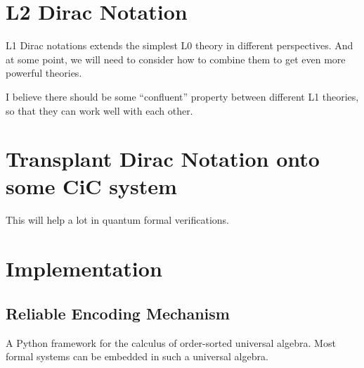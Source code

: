 \section{L2 Dirac Notation}

L1 Dirac notations extends the simplest L0 theory in different perspectives.
And at some point, we will need to consider how to combine them to get even more powerful theories.

I believe there should be some ``confluent'' property between different L1 theories, so that they can work well with each other.

\section{Transplant Dirac Notation onto some CiC system}

This will help a lot in quantum formal verifications.

\section{Implementation}
\subsection{Reliable Encoding Mechanism}

A Python framework for the calculus of order-sorted universal algebra. Most formal systems can be embedded in such a universal algebra.

